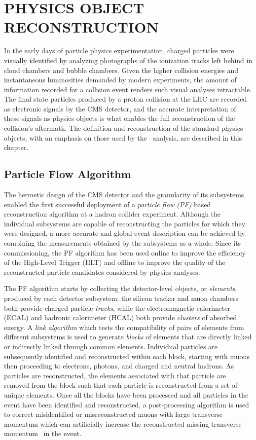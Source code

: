 \chapter{PHYSICS OBJECT RECONSTRUCTION} \label{reco}

In the early days of particle physics experimentation, charged particles were visually identified by analyzing photographs of the ionization tracks left behind in cloud chambers and bubble chambers. Given the higher collision energies and instantaneous luminosities demanded by modern experiments, the amount of information recorded for a collision event renders such visual analyses intractable. The final state particles produced by a proton collision at the LHC are recorded as electronic signals by the CMS detector, and the accurate interpretation of these signals as physics objects is what enables the full reconstruction of the collision's aftermath. The definition and reconstruction of the standard physics objects, with an emphasis on those used by the \VHbb\ analysis, are described in this chapter.

\section{Particle Flow Algorithm}

The hermetic design of the CMS detector and the granularity of its subsystems enabled the first successful deployment of a \textit{particle flow (PF)} based reconstruction algorithm at a hadron collider experiment.\cite{PARTICLEFLOW} Although the individual subsystems are capable of reconstructing the particles for which they were designed, a more accurate and global event description can be achieved by combining the measurements obtained by the subsystems as a whole. Since its commissioning, the PF algorithm has been used online to improve the efficiency of the High-Level Trigger (HLT) and offline to improve the quality of the reconstructed particle candidates considered by physics analyses.

The PF algorithm starts by collecting the detector-level objects, or \textit{elements}, produced by each detector subsystem: the silicon tracker and muon chambers both provide charged particle \textit{tracks}, while the electromagnetic calorimeter (ECAL) and hadronic calorimeter (HCAL) both provide \textit{clusters} of absorbed energy. A \textit{link algorithm} which tests the compatibility of pairs of elements from different subsystems is used to generate \textit{blocks} of elements that are directly linked or indirectly linked through common elements. Individual particles are subsequently identified and reconstructed within each block, starting with muons then proceeding to electrons, photons, and charged and neutral hadrons. As particles are reconstructed, the elements associated with that particle are removed from the block such that each particle is reconstructed from a set of unique elements. Once all the blocks have been processed and all particles in the event have been identified and reconstructed, a post-processing algorithm is used to correct misidentified or misreconstructed muons with large transverse momentum \pT which can artificially increase the reconstructed missing transverse momentum \pTmiss\ in the event.

